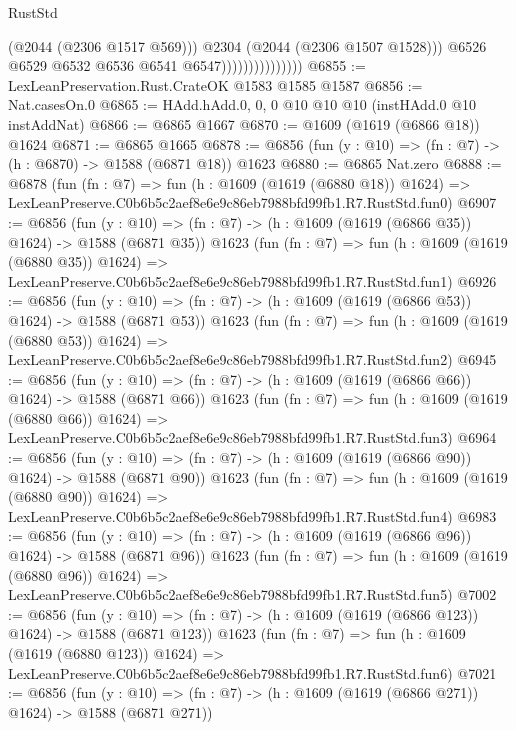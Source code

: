 \begin{lexlean}{RustStd}
\begin{coremodule}
                                      (@2044 (@2306 @1517 @569)))
                                    @2304
                                    (@2044 (@2306 @1507 @1528)))
                                  @6526
                                  @6529
                                  @6532
                                  @6536
                                  @6541
                                  @6547)))))))))))))))
@6855 := LexLeanPreservation.Rust.CrateOK @1583 @1585 @1587
@6856 := Nat.casesOn.{0}
@6865 := HAdd.hAdd.{0, 0, 0} @10 @10 @10 (instHAdd.{0} @10 instAddNat)
@6866 := @6865 @1667
@6870 := @1609 (@1619 (@6866 @18)) @1624
@6871 := @6865 @1665
@6878 := @6856 (fun (y : @10) => (fn : @7) -> (h : @6870) -> @1588 (@6871 @18)) @1623
@6880 := @6865 Nat.zero
@6888 := @6878
    (fun (fn : @7) =>
    fun (h : @1609 (@1619 (@6880 @18)) @1624) =>
    LexLeanPreserve.C0b6b5c2aef8e6e9c86eb7988bfd99fb1.R7.RustStd.fun0)
@6907 := @6856
    (fun (y : @10) => (fn : @7) -> (h : @1609 (@1619 (@6866 @35)) @1624) -> @1588 (@6871 @35))
    @1623
    (fun (fn : @7) =>
    fun (h : @1609 (@1619 (@6880 @35)) @1624) =>
    LexLeanPreserve.C0b6b5c2aef8e6e9c86eb7988bfd99fb1.R7.RustStd.fun1)
@6926 := @6856
    (fun (y : @10) => (fn : @7) -> (h : @1609 (@1619 (@6866 @53)) @1624) -> @1588 (@6871 @53))
    @1623
    (fun (fn : @7) =>
    fun (h : @1609 (@1619 (@6880 @53)) @1624) =>
    LexLeanPreserve.C0b6b5c2aef8e6e9c86eb7988bfd99fb1.R7.RustStd.fun2)
@6945 := @6856
    (fun (y : @10) => (fn : @7) -> (h : @1609 (@1619 (@6866 @66)) @1624) -> @1588 (@6871 @66))
    @1623
    (fun (fn : @7) =>
    fun (h : @1609 (@1619 (@6880 @66)) @1624) =>
    LexLeanPreserve.C0b6b5c2aef8e6e9c86eb7988bfd99fb1.R7.RustStd.fun3)
@6964 := @6856
    (fun (y : @10) => (fn : @7) -> (h : @1609 (@1619 (@6866 @90)) @1624) -> @1588 (@6871 @90))
    @1623
    (fun (fn : @7) =>
    fun (h : @1609 (@1619 (@6880 @90)) @1624) =>
    LexLeanPreserve.C0b6b5c2aef8e6e9c86eb7988bfd99fb1.R7.RustStd.fun4)
@6983 := @6856
    (fun (y : @10) => (fn : @7) -> (h : @1609 (@1619 (@6866 @96)) @1624) -> @1588 (@6871 @96))
    @1623
    (fun (fn : @7) =>
    fun (h : @1609 (@1619 (@6880 @96)) @1624) =>
    LexLeanPreserve.C0b6b5c2aef8e6e9c86eb7988bfd99fb1.R7.RustStd.fun5)
@7002 := @6856
    (fun (y : @10) => (fn : @7) -> (h : @1609 (@1619 (@6866 @123)) @1624) -> @1588 (@6871 @123))
    @1623
    (fun (fn : @7) =>
    fun (h : @1609 (@1619 (@6880 @123)) @1624) =>
    LexLeanPreserve.C0b6b5c2aef8e6e9c86eb7988bfd99fb1.R7.RustStd.fun6)
@7021 := @6856
    (fun (y : @10) => (fn : @7) -> (h : @1609 (@1619 (@6866 @271)) @1624) -> @1588 (@6871 @271))

\end{coremodule}
\end{lexlean}
